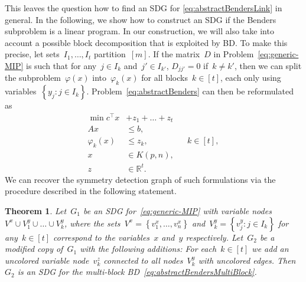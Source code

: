 \documentclass[a4paper,10pt]{article}
\newcommand{\R}{\mathds{R}}
\newcommand{\sprod}[2]{#1^\top #2}
\newcommand{\brackets}[1]{\left\{ #1 \right\}}
\newtheorem{theorem}{Theorem}
\theoremstyle{definition}
\begin{document}
This leaves the question how to find an SDG for \eqref{eq:abstractBendersLink} in general.
In the following, we show how to construct an SDG if the Benders subproblem is a linear program.
In our construction, we will also take into account a possible block decomposition that is exploited by BD.
To make this precise, let sets~$I_1, \dots, I_t$ partition~$[m]$.
If the matrix~$D$ in Problem~\eqref{eq:generic-MIP} is such that for any~$j\in I_{k}$ and~$j'\in I_{k'}$, $D_{jj'} = 0$ if~$k\neq k'$, then we can split the subproblem~$\varphi(x)$ into~$\varphi_k(x)$ for all blocks~$k\in [t]$, each only using variables~$\brackets{y_j: j\in I_k}$.
Problem~\eqref{eq:abstractBenders} can then be reformulated as
\begin{subequations}
  \label{eq:abstractBendersMultiBlock}
  \begin{align}
    \min \sprod{c}{x} &+ z_1 + \dots + z_t && \\
    Ax &\leq b,&&\\
    \varphi_k(x) &\leq z_k, && k \in [t], \label{eq:abstractBendersLinkBlock}\\
    x &\in K(p, n), && \\
    z &\in \R^t.&&
  \end{align}
\end{subequations}  
We can recover the symmetry detection graph of such formulations via the procedure described in the following statement.
%
\begin{theorem}
  \label{thm:SDG-Benders}
  Let~$G_1$ be an SDG for~\eqref{eq:generic-MIP} with variable nodes~$V^x\cup V^y_1 \cup \dots \cup V^y_k$, where the sets~$V^x = \brackets{v^x_1, \dots, v^x_n}$ and~$V^y_k = \brackets{v^y_j: j\in I_k}$ for any~$k\in[t]$ correspond to the variables~$x$ and~$y$ respectively.
  Let~$G_2$ be a modified copy of~$G_1$ with the following additions: 
  For each~$k\in [t]$ we add an uncolored variable node~$v^z_k$ connected to all nodes~$V^y_k$ with uncolored edges.
  Then $G_2$ is an SDG for the multi-block BD~\eqref{eq:abstractBendersMultiBlock}.
\end{theorem}
%
\end{document}
